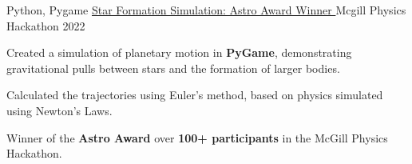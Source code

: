 \begin{cventries}
  \cventry
    {Python, Pygame} %
    {\href{https://devpost.com/software/star-formation}{Star Formation Simulation: Astro Award Winner {\faLink}}} %
    {Mcgill Physics Hackathon} %
    {2022} %
    {
      \begin{cvitems} %
        \item {Created a simulation of planetary motion in \textbf{PyGame}, demonstrating gravitational pulls between stars and the formation of larger bodies.}
        \item {Calculated the trajectories using Euler's method, based on physics simulated using Newton's Laws.}
        \item {Winner of the \textbf{Astro Award} over \textbf{100+ participants} in the McGill Physics Hackathon. }
      \end{cvitems}
    }


\end{cventries}
